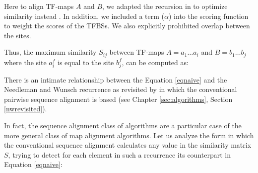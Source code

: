 Here to align TF-maps $A$ and $B$, we adapted the recursion in
\cite{waterman:1984c} to optimize similarity instead \citep{blanco:2006b}. In addition, we
included a term ($\alpha$) into the scoring function to weight the scores of the
TFBSs. We also explicitly prohibited overlap between the sites.

Thus, the maximum similarity $S_{ij}$ between TF-maps  $A = a_1 \ldots a_i$ and 
$B = b_1 \ldots b_j$ where the site $a_i^f$ is equal to the site $b_j^f$, 
can be computed as: 

\begin{center}
\end{center}


 
There is an intimate relationship between the Equation \ref{eqnaive} and the Needleman
and Wunsch recurrence as revisited by \citet{smith:1981b} in which the conventional pairwise 
sequence alignment is based (see Chapter \ref{sec:algorithms}, Section \ref{nwrevisited}).

In fact, the sequence alignment class of algorithms are a particular case of the
more general class of map alignment algorithms. Let us analyze the form in which
the conventional sequence alignment calculates any value in the similarity matrix $S$, trying
to detect for each element in such a recurrence its counterpart in Equation \ref{eqnaive}:

